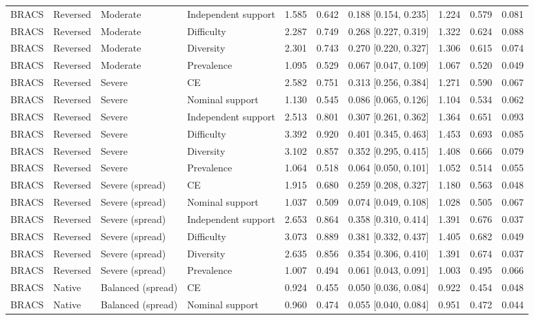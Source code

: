 \begin{longtable}{llllllllll}
BRACS & Reversed & Moderate & Independent support & 1.585 & 0.642 & 0.188 [0.154, 0.235] & 1.224 & 0.579 & 0.081 \\
BRACS & Reversed & Moderate & Difficulty & 2.287 & 0.749 & 0.268 [0.227, 0.319] & 1.322 & 0.624 & 0.088 \\
BRACS & Reversed & Moderate & Diversity & 2.301 & 0.743 & 0.270 [0.220, 0.327] & 1.306 & 0.615 & 0.074 \\
BRACS & Reversed & Moderate & Prevalence & 1.095 & 0.529 & 0.067 [0.047, 0.109] & 1.067 & 0.520 & 0.049 \\
BRACS & Reversed & Severe & CE & 2.582 & 0.751 & 0.313 [0.256, 0.384] & 1.271 & 0.590 & 0.067 \\
BRACS & Reversed & Severe & Nominal support & 1.130 & 0.545 & 0.086 [0.065, 0.126] & 1.104 & 0.534 & 0.062 \\
BRACS & Reversed & Severe & Independent support & 2.513 & 0.801 & 0.307 [0.261, 0.362] & 1.364 & 0.651 & 0.093 \\
BRACS & Reversed & Severe & Difficulty & 3.392 & 0.920 & 0.401 [0.345, 0.463] & 1.453 & 0.693 & 0.085 \\
BRACS & Reversed & Severe & Diversity & 3.102 & 0.857 & 0.352 [0.295, 0.415] & 1.408 & 0.666 & 0.079 \\
BRACS & Reversed & Severe & Prevalence & 1.064 & 0.518 & 0.064 [0.050, 0.101] & 1.052 & 0.514 & 0.055 \\
BRACS & Reversed & Severe (spread) & CE & 1.915 & 0.680 & 0.259 [0.208, 0.327] & 1.180 & 0.563 & 0.048 \\
BRACS & Reversed & Severe (spread) & Nominal support & 1.037 & 0.509 & 0.074 [0.049, 0.108] & 1.028 & 0.505 & 0.067 \\
BRACS & Reversed & Severe (spread) & Independent support & 2.653 & 0.864 & 0.358 [0.310, 0.414] & 1.391 & 0.676 & 0.037 \\
BRACS & Reversed & Severe (spread) & Difficulty & 3.073 & 0.889 & 0.381 [0.332, 0.437] & 1.405 & 0.682 & 0.049 \\
BRACS & Reversed & Severe (spread) & Diversity & 2.635 & 0.856 & 0.354 [0.306, 0.410] & 1.391 & 0.674 & 0.037 \\
BRACS & Reversed & Severe (spread) & Prevalence & 1.007 & 0.494 & 0.061 [0.043, 0.091] & 1.003 & 0.495 & 0.066 \\
BRACS & Native & Balanced (spread) & CE & 0.924 & 0.455 & 0.050 [0.036, 0.084] & 0.922 & 0.454 & 0.048 \\
BRACS & Native & Balanced (spread) & Nominal support & 0.960 & 0.474 & 0.055 [0.040, 0.084] & 0.951 & 0.472 & 0.044 \\

\end{longtable}
